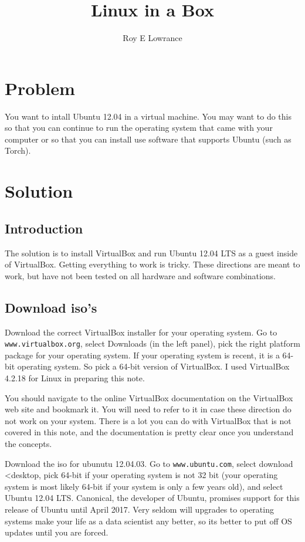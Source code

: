 \documentclass{article}
\let\code\texttt %
\begin{document}
\title{Linux in a Box}
\author{Roy E Lowrance}
\maketitle


\section{Problem}
You want to intall Ubuntu 12.04 in a virtual machine. You may want to do
this so that you can continue to run the operating system that came with
your computer or so that you can install use software that supports
Ubuntu (such as Torch).

\section{Solution}

\subsection{Introduction}

The solution is to install VirtualBox and run Ubuntu 12.04 LTS as a
guest inside of VirtualBox. Getting everything to work is tricky. These
directions are meant to work, but have not been tested on all hardware
and software combinations.

\subsection{Download iso's}

Download the correct VirtualBox installer for your operating system. Go
to \code{www.virtualbox.org}, select Downloads (in the left panel), pick
the right platform package for your operating system. If your operating
system is recent, it is a 64-bit operating system. So pick a 64-bit
version of VirtualBox. I used VirtualBox 4.2.18 for Linux in preparing
this note.

You should navigate to the online VirtualBox documentation on the
VirtualBox web site and bookmark it. You will need to refer to it in
case these direction do not work on your system. There is a lot you can
do with VirtualBox that is not covered in this note, and the
documentation is pretty clear once you understand the concepts.

Download the iso for ubunutu 12.04.03.  Go to \code{www.ubuntu.com},
select download \textless desktop, pick 64-bit if your operating system is not
32 bit (your operating system is most likely 64-bit if your system is
only a few years old), and select Ubuntu 12.04 LTS. Canonical, the
developer of Ubuntu, promises support for this release of Ubuntu until
April 2017. Very seldom will upgrades to operating systems make your
life as a data scientist any better, so its better to put off OS updates
until you are forced.
\end{document}
